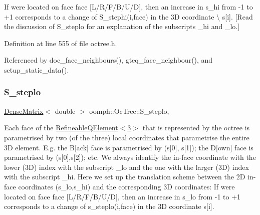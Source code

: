 If we\textquotesingle{}re located on face {\ttfamily face} \mbox{[}L/\+R/\+F/\+B/\+U/D\mbox{]}, then an increase in s\+\_\+hi from -\/1 to +1 corresponds to a change of {\ttfamily S\+\_\+stephi(i,face)} in the 3D coordinate \textbackslash{} s\mbox{[}i\mbox{]}. \mbox{[}Read the discussion of {\ttfamily S\+\_\+steplo} for an explanation of the subscripts {\ttfamily \+\_\+hi} and {\ttfamily \+\_\+lo}.\mbox{]} 

Definition at line 555 of file octree.\+h.



Referenced by doc\+\_\+face\+\_\+neighbours(), gteq\+\_\+face\+\_\+neighbour(), and setup\+\_\+static\+\_\+data().

\mbox{\label{classoomph_1_1OcTree_af1c005f0207cae66390314859edd9bd1}} 
\subsubsection{\texorpdfstring{S\+\_\+steplo}{S\_steplo}}
{\footnotesize\ttfamily \hyperlink{classoomph_1_1DenseMatrix}{Dense\+Matrix}$<$ double $>$ oomph\+::\+Oc\+Tree\+::\+S\+\_\+steplo\hspace{0.3cm}{\ttfamily [static]}, {\ttfamily [private]}}



Each face of the \hyperlink{classoomph_1_1RefineableQElement_3_013_01_4}{Refineable\+Q\+Element$<$3$>$} that is represented by the octree is parametrised by two (of the three) local coordinates that parametrise the entire 3D element. E.\+g. the B\mbox{[}ack\mbox{]} face is parametrised by (s\mbox{[}0\mbox{]}, s\mbox{[}1\mbox{]}); the D\mbox{[}own\mbox{]} face is parametrised by (s\mbox{[}0\mbox{]},s\mbox{[}2\mbox{]}); etc. We always identify the in-\/face coordinate with the lower (3D) index with the subscript {\ttfamily \+\_\+lo} and the one with the larger (3D) index with the subscript {\ttfamily \+\_\+hi}. Here we set up the translation scheme between the 2D in-\/face coordinates (s\+\_\+lo,s\+\_\+hi) and the corresponding 3D coordinates\+: If we\textquotesingle{}re located on face {\ttfamily face} \mbox{[}L/\+R/\+F/\+B/\+U/D\mbox{]}, then an increase in s\+\_\+lo from -\/1 to +1 corresponds to a change of {\ttfamily s\+\_\+steplo(i,face)} in the 3D coordinate {\ttfamily s}\mbox{[}i\mbox{]}. 

